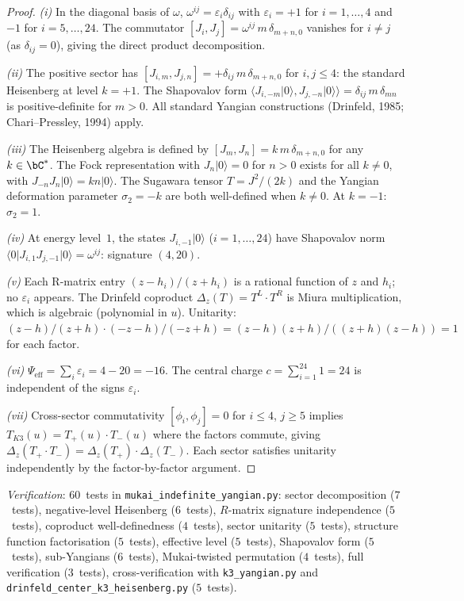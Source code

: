 \begin{proof}
\emph{(i)} In the diagonal basis of $\omega$,
$\omega^{ij} = \varepsilon_i \delta_{ij}$ with
$\varepsilon_i = +1$ for $i = 1,\ldots,4$ and $-1$ for $i = 5,\ldots,24$.
The commutator $[J_i, J_j] = \omega^{ij}\, m\, \delta_{m+n,0}$
vanishes for $i \neq j$ (as $\delta_{ij} = 0$), giving the direct product
decomposition.

\emph{(ii)} The positive sector has $[J_{i,m}, J_{j,n}] = +\delta_{ij}\,
m\, \delta_{m+n,0}$ for $i,j \leq 4$: the standard Heisenberg at level
$k = +1$. The Shapovalov form
$\langle J_{i,-m}\lvert 0\rangle, J_{j,-n}\lvert 0\rangle\rangle
= \delta_{ij}\, m\, \delta_{mn}$
is positive-definite for $m > 0$.  All standard Yangian constructions
(Drinfeld, 1985; Chari--Pressley, 1994) apply.

\emph{(iii)} The Heisenberg algebra is defined by
$[J_m, J_n] = k\, m\, \delta_{m+n,0}$ for any $k \in \bC^*$.
The Fock representation with $J_n \lvert 0\rangle = 0$ for $n > 0$ exists
for all $k \neq 0$, with $J_{-n} J_n \lvert 0\rangle = kn\lvert 0\rangle$.
The Sugawara tensor $T = J^2/(2k)$ and the Yangian deformation parameter
$\sigma_2 = -k$ are both well-defined when $k \neq 0$.  At $k = -1$:
$\sigma_2 = 1$.

\emph{(iv)} At energy level~$1$, the states $J_{i,-1}\lvert 0\rangle$
($i = 1,\ldots,24$) have Shapovalov norm
$\langle 0\rvert J_{i,1} J_{j,-1}\lvert 0\rangle = \omega^{ij}$:
signature $(4,20)$.

\emph{(v)} Each R-matrix entry $(z-h_i)/(z+h_i)$ is a rational function
of $z$ and $h_i$; no $\varepsilon_i$ appears.  The Drinfeld coproduct
$\Delta_z(T) = T^L \cdot T^R$ is Miura multiplication, which is
algebraic (polynomial in $u$).  Unitarity:
$(z-h)/(z+h) \cdot (-z-h)/(-z+h) = (z-h)(z+h)/((z+h)(z-h)) = 1$
for each factor.

\emph{(vi)} $\Psi_{\mathrm{eff}} = \sum_i \varepsilon_i = 4 - 20 = -16$.
The central charge $c = \sum_{i=1}^{24} 1 = 24$ is independent
of the signs $\varepsilon_i$.

\emph{(vii)} Cross-sector commutativity $[\phi_i, \phi_j] = 0$ for
$i \leq 4$, $j \geq 5$ implies $T_{K3}(u) = T_+(u) \cdot T_-(u)$
where the factors commute, giving
$\Delta_z(T_+ \cdot T_-) = \Delta_z(T_+) \cdot \Delta_z(T_-)$.
Each sector satisfies unitarity independently by the factor-by-factor
argument.
\end{proof}

\noindent\textit{Verification}: $60$~tests in
\texttt{mukai\_indefinite\_yangian.py}:
sector decomposition ($7$~tests), negative-level Heisenberg
($6$~tests), $R$-matrix signature independence ($5$~tests), coproduct
well-definedness ($4$~tests), sector unitarity ($5$~tests), structure
function factorisation ($5$~tests), effective level ($5$~tests),
Shapovalov form ($5$~tests), sub-Yangians ($6$~tests),
Mukai-twisted permutation ($4$~tests), full verification ($3$~tests),
cross-verification with \texttt{k3\_yangian.py} and
\texttt{drinfeld\_center\_k3\_heisenberg.py} ($5$~tests).

